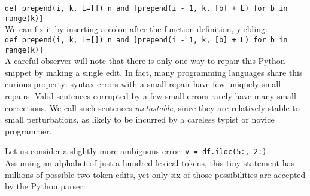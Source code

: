 \documentclass[sigplan,review,acmsmall,nonacm,anonymous]{acmart}\settopmatter{printfolios=false,printccs=false,printacmref=false}
\begin{document}
  \texttt{def prepend(i, k, L=[]) n and [prepend(i - 1, k, [b] + L) for b in range(k)]}\\

  We can fix it by inserting a colon after the function definition, yielding:\\

  \texttt{def prepend(i, k, L=[])\hlgreen{:} n and [prepend(i - 1, k, [b] + L) for b in range(k)]}\\

  A careful observer will note that there is only one way to repair this Python snippet by making a single edit. In fact, many programming languages share this curious property: syntax errors with a small repair have few uniquely small repairs. Valid sentences corrupted by a few small errors rarely have many small corrections. We call such sentences \textit{metastable}, since they are relatively stable to small perturbations, as likely to be incurred by a careless typist or novice programmer.
%
%
%

  Let us consider a slightly more ambiguous error: \texttt{v = df.iloc(5:, 2:)}. Assuming an alphabet of just a hundred lexical tokens, this tiny statement has millions of possible two-token edits, yet only six of those possibilities are accepted by the Python parser:
\end{document}
